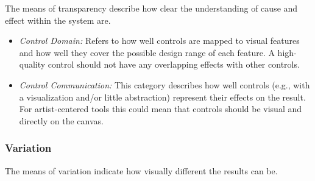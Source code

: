 The means of transparency describe how clear the understanding of cause and effect within the system are.
\begin{itemize}
    \item \textit{Control Domain:} Refers to how well controls are mapped to visual features and how well they cover the possible design range of each feature. A high-quality control should not have any overlapping effects with other controls.


    \item \textit{Control Communication:} This category describes how well controls (e.g., with a visualization and/or little abstraction) represent their effects on the result. For artist-centered tools this could mean that controls should be visual and directly on the canvas.

\end{itemize}


\subsubsection{Variation}
\label{subsubsec:variation}
The means of variation indicate how visually different the results can be.

